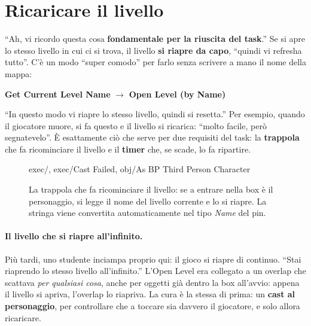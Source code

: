 \section{Ricaricare il livello}
\label{gd12:sec:ricarica}

``Ah, vi ricordo questa cosa \textbf{fondamentale per la riuscita del task}.''
Se si apre lo stesso livello in cui ci si trova, il livello \textbf{si riapre da
capo}, ``quindi vi refresha tutto''. C'è un modo ``super comodo'' per farlo
senza scrivere a mano il nome della mappa:
\begin{center}
\textbf{Get Current Level Name} $\rightarrow$ \textbf{Open Level (by Name)}
\end{center}
``In questo modo vi riapre lo stesso livello, quindi si resetta.'' Per esempio,
quando il giocatore muore, si fa questo e il livello si ricarica: ``molto
facile, però segnatevelo''. È esattamente ciò che serve per due requisiti del
task: la \textbf{trappola} che fa ricominciare il livello e il \textbf{timer}
che, se scade, lo fa ripartire.

\begin{figure}[htbp]
\centering
\begin{bpgraph}
    {exec/, exec/Cast Failed, obj/As BP Third Person Character}
\end{bpgraph}
\caption{La trappola che fa ricominciare il livello: se a entrare nella box è
il personaggio, si legge il nome del livello corrente e lo si riapre. La
stringa viene convertita automaticamente nel tipo \emph{Name} del pin.}
\label{gd12:fig:ricarica}
\end{figure}

\paragraph{Il livello che si riapre all'infinito.} Più tardi, uno studente
inciampa proprio qui: il gioco si riapre di continuo. ``Stai riaprendo lo stesso
livello all'infinito.'' L'Open Level era collegato a un overlap che scattava
\emph{per qualsiasi cosa}, anche per oggetti già dentro la box all'avvio:
appena il livello si apriva, l'overlap lo riapriva. La cura è la stessa di prima:
un \textbf{cast al personaggio}, per controllare che a toccare sia davvero il
giocatore, e solo allora ricaricare.

